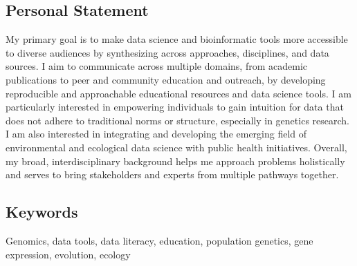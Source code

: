 \documentclass{cv}
\begin{document}
\subsection*{Personal Statement}

My primary goal is to make data science and bioinformatic tools more accessible to diverse audiences by synthesizing across approaches, disciplines, and data sources. I aim to communicate across multiple domains, from academic publications to peer and community education and outreach, by developing reproducible and approachable educational resources and data science tools. I am particularly interested in empowering individuals to gain intuition for data that does not adhere to traditional norms or structure, especially in genetics research. I am also interested in integrating and developing the emerging field of environmental and ecological data science with public health initiatives. Overall, my broad, interdisciplinary background helps me approach problems holistically and serves to bring stakeholders and experts from multiple pathways together.

\subsection*{Keywords}

Genomics, data tools, data literacy, education, population genetics, gene expression, evolution, ecology
\end{document}

